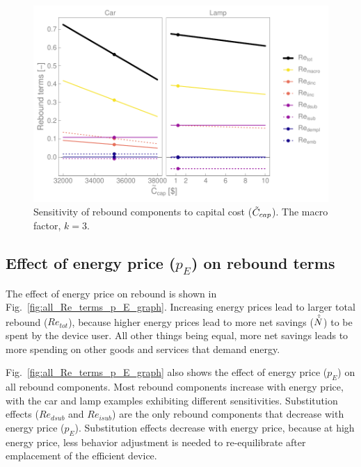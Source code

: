 \documentclass[12pt]{article}\usepackage[]{graphicx}\usepackage[]{xcolor}
\makeatletter
\def\maxwidth{ %
  \ifdim\Gin@nat@width>\linewidth
    \linewidth
  \else
    \Gin@nat@width
  \fi
}
\newenvironment{knitrout}{}{} %
\makeatother
\begin{document}
\begin{knitrout}
\color{fgcolor}\begin{figure}

{\centering \includegraphics[width=\maxwidth]{figure/all_Re_terms_C_cap_graph-1} 

}

\caption[Sensitivity of rebound components to capital cost ($\amacro{C}_{cap}$)]{Sensitivity of rebound components to capital cost ($\amacro{C}_{cap}$). The macro factor, $k = 3$.}\label{fig:all_Re_terms_C_cap_graph}
\end{figure}

\end{knitrout}


\subsection{Effect of energy price ($p_E$) on rebound terms} 
\label{sec:effect_of_energy_price}




The effect of energy price on rebound is shown in Fig.~\ref{fig:all_Re_terms_p_E_graph}.
Increasing energy prices lead to larger total rebound ($Re_{tot}$),
because higher energy prices lead to more net savings ($\hat{\dot{N}}$)
to be spent by the device user.
All other things being equal, more net savings leads to 
more spending on other goods and services that demand energy.

Fig.~\ref{fig:all_Re_terms_p_E_graph} also 
shows the effect of energy price ($p_E$)
on all rebound components.
Most rebound components increase with energy price, 
with the car and lamp examples exhibiting different sensitivities. 
Substitution effects ($Re_{dsub}$ and $Re_{isub}$)
are the only rebound components that decrease with energy price ($p_E$).
Substitution effects decrease with energy price, because 
at high energy price, less behavior adjustment is needed to re-equilibrate 
after emplacement of the efficient device.
\end{document}
